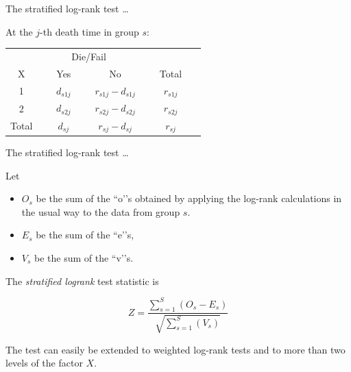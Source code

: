\documentclass[ignorenonframetext,]{beamer}
\begin{document}
\begin{frame}{%
\protect\hypertarget{the-stratified-log-rank-test-2}{%
The stratified log-rank test \ldots}}

At the \(j\)-th death time in group \(s\):

\begin{center}
\begin{tabular}{cccc}
\hline \hline 
& \multicolumn{2}{c}{Die/Fail} & \\ \cline{2-3}
\multicolumn{1}{c}{X} & ~~~Yes~~~ & ~~~No~~~ & ~~~Total~~~\\ \hline
1 & $d_{s1j}$ & $r_{s1j} - d_{s1j}$ & $r_{s1j}$ \\[2ex]
2 & $d_{s2j}$ & $r_{s2j} - d_{s2j}$ & $r_{s2j}$  \\
\hline
Total &  $d_{sj}  $ & $r_{sj}   - d_{sj}  $ & $r_{sj}  $  \\ 
\hline \hline
\end{tabular}
\end{center}

\end{frame}

\begin{frame}{%
\protect\hypertarget{the-stratified-log-rank-test-3}{%
The stratified log-rank test \ldots}}

Let

\begin{itemize}
\item
  \(O_s\) be the sum of the ``o’’s obtained by applying the log-rank
  calculations in the usual way to the data from group \(s\).
\item
  \(E_s\) be the sum of the ``e’’s,
\item
  \(V_s\) be the sum of the ``v’’s.
\end{itemize}

The \emph{stratified logrank} test statistic is

\[  Z = \frac{\sum_{s=1}^{S} (O_s - E_s)}{\sqrt{\sum_{s=1}^{S} (V_s)}} \]

The test can easily be extended to weighted log-rank tests and to more
than two levels of the factor \(X\).

\end{frame}
\end{document}
